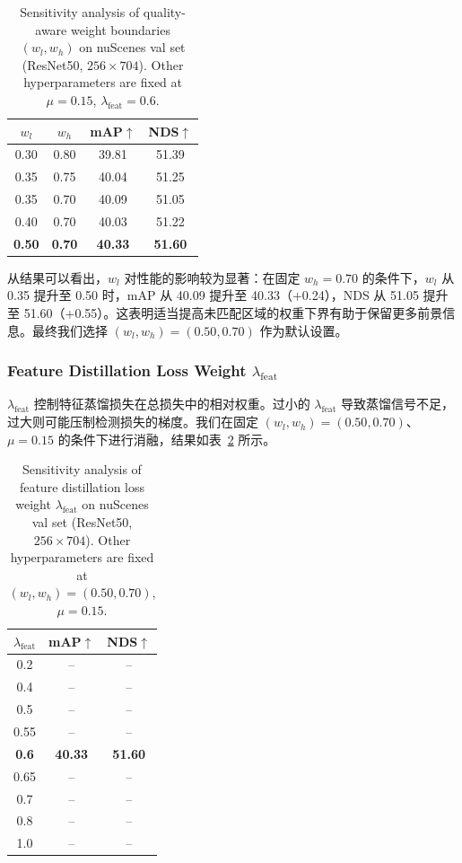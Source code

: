 \documentclass[12pt, UTF8]{ctexart}
\begin{document}
\begin{table}[H]
\centering
\caption{Sensitivity analysis of quality-aware weight boundaries $(w_l, w_h)$ on nuScenes val set (ResNet50, $256\times704$). Other hyperparameters are fixed at $\mu = 0.15$, $\lambda_{\text{feat}} = 0.6$.}
\label{tab:wl_wh}
\small
\vspace{2mm}
\begin{tabular}{cc|cc}
\toprule
$w_l$ & $w_h$ & mAP$\uparrow$ & NDS$\uparrow$ \\
\midrule
0.30 & 0.80 & 39.81 & 51.39 \\
0.35 & 0.75 & 40.04 & 51.25 \\
0.35 & 0.70 & 40.09 & 51.05 \\
0.40 & 0.70 & 40.03 & 51.22 \\
\textbf{0.50} & \textbf{0.70} & \textbf{40.33} & \textbf{51.60} \\
\bottomrule
\end{tabular}
\end{table}

从结果可以看出，$w_l$ 对性能的影响较为显著：在固定 $w_h = 0.70$ 的条件下，$w_l$ 从 0.35 提升至 0.50 时，mAP 从 40.09 提升至 40.33（+0.24），NDS 从 51.05 提升至 51.60（+0.55）。这表明适当提高未匹配区域的权重下界有助于保留更多前景信息。最终我们选择 $(w_l, w_h) = (0.50, 0.70)$ 作为默认设置。

\subsubsection{Feature Distillation Loss Weight $\lambda_{\text{feat}}$}
$\lambda_{\text{feat}}$ 控制特征蒸馏损失在总损失中的相对权重。过小的 $\lambda_{\text{feat}}$ 导致蒸馏信号不足，过大则可能压制检测损失的梯度。我们在固定 $(w_l, w_h) = (0.50, 0.70)$、$\mu = 0.15$ 的条件下进行消融，结果如表~\ref{tab:lambda} 所示。

\begin{table}[H]
\centering
\caption{Sensitivity analysis of feature distillation loss weight $\lambda_{\text{feat}}$ on nuScenes val set (ResNet50, $256\times704$). Other hyperparameters are fixed at $(w_l, w_h) = (0.50, 0.70)$, $\mu = 0.15$.}
\label{tab:lambda}
\small
\vspace{2mm}
\begin{tabular}{c|cc}
\toprule
$\lambda_{\text{feat}}$ & mAP$\uparrow$ & NDS$\uparrow$ \\
\midrule
0.2 & -- & -- \\
0.4 & -- & -- \\
0.5 & -- & -- \\
0.55 & -- & -- \\
\textbf{0.6} & \textbf{40.33} & \textbf{51.60} \\
0.65 & -- & -- \\
0.7 & -- & -- \\
0.8 & -- & -- \\
1.0 & -- & -- \\
\bottomrule
\end{tabular}
\end{table}
\end{document}
